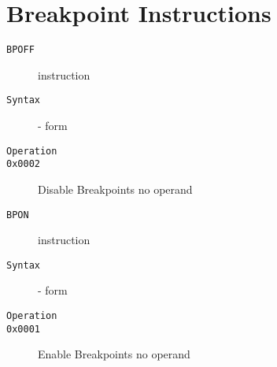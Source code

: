 \section{Breakpoint Instructions}
\begin{description}
\item[\texttt{BPOFF}] instruction\\
\item[\texttt{Syntax}] - form \\

\item[\texttt{Operation}]
\item[\texttt{}]
\item[\texttt{0x0002}] Disable Breakpoints  no operand          \\
\end{description}
\clearpage
\begin{description}
\item[\texttt{BPON}] instruction\\
\item[\texttt{Syntax}] - form \\

\item[\texttt{Operation}]
\item[\texttt{}]
\item[\texttt{0x0001}] Enable Breakpoints  no operand          \\
\end{description}
\clearpage
